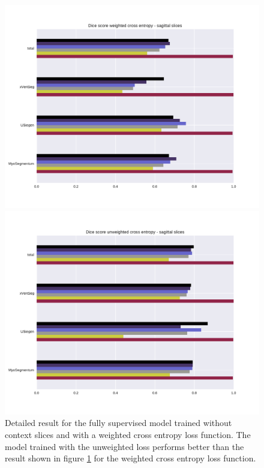 \begin{figure}
    \centering
    \begin{minipage}{.98\textwidth}
        \includegraphics[width=.98\textwidth]{images/full_perClass_perSource_weighted.pdf}
    \end{minipage} 
    \begin{minipage}{0.98\textwidth}
        \includegraphics[width=.98\textwidth]{images/full_perClass_perSource_notweighted.pdf}
    \end{minipage}
    \caption{Detailed result for the fully supervised model trained without context slices and with a weighted cross entropy loss function.
    The model trained with the unweighted loss performs better than the result shown in figure \ref{fig:referenceWeighted} for the weighted cross entropy loss function.
    \protect
    \label{fig:referenceWeighted} 
    }
\end{figure}


